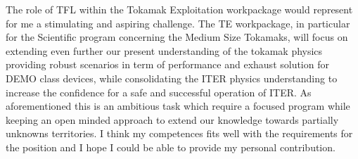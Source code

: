 \documentclass[12pt,a4paper,sans]{moderncv}        %
\begin{document}
The role of TFL within the Tokamak Exploitation workpackage would represent
for me a stimulating and aspiring challenge. The TE workpackage, in
particular for the Scientific program concerning the Medium Size
Tokamaks, will focus on extending even further our present understanding of
the tokamak physics providing robust scenarios in term of performance
and exhaust solution for DEMO class devices, while consolidating
the ITER physics understanding to increase the confidence for a
safe and successful operation of ITER. As aforementioned this is an
ambitious task which require a focused program while keeping an open
minded approach to extend our knowledge towards partially unknowns
territories. I think my competences fits well with the requirements
for the position and I hope I could be able to provide my personal contribution.


\makeletterclosing
\end{document}
